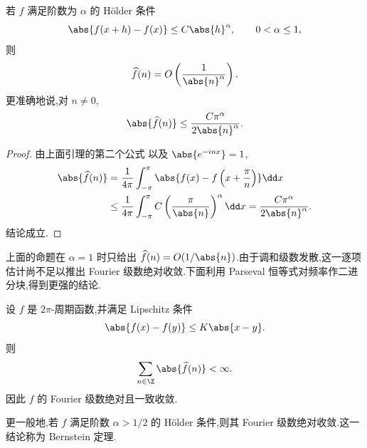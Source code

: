 \begin{proposition}
若 $f$ 满足阶数为 $\alpha$ 的 Hölder 条件
\[
\abs{f(x+h)-f(x)}\leq C\abs{h}^{\alpha},
\qquad 0<\alpha\leq1,
\]
则
\[
\widehat f(n)=O\left(\frac1{\abs{n}^{\alpha}}\right).
\]
更准确地说,对 $n\neq0$,
\[
\abs{\widehat f(n)}
\leq \frac{C\pi^{\alpha}}{2\abs{n}^{\alpha}}.
\]
\end{proposition}

\begin{proof}
由上面引理的第二个公式 以及 $\abs{e^{-inx}}=1$,
\[
\begin{aligned}
\abs{\widehat f(n)}
&=\frac1{4\pi}\int_{-\pi}^{\pi}
\abs{f(x)-f\left(x+\frac{\pi}{n}\right)}\dd x\\
&\leq\frac1{4\pi}\int_{-\pi}^{\pi}
C\left(\frac{\pi}{\abs{n}}\right)^{\alpha}\dd x
=\frac{C\pi^{\alpha}}{2\abs{n}^{\alpha}}.
\end{aligned}
\]
结论成立.
\end{proof}
上面的命题在 $\alpha=1$ 时只给出 $\widehat f(n)=O(1/\abs{n})$.由于调和级数发散,这一逐项估计尚不足以推出 Fourier 级数绝对收敛.下面利用 Parseval 恒等式对频率作二进分块,得到更强的结论.

\begin{proposition}
设 $f$ 是 $2\pi$-周期函数,并满足 Lipschitz 条件
\[
\abs{f(x)-f(y)}\leq K\abs{x-y}.
\]
则
\[
\sum_{n\in\Z}\abs{\widehat f(n)}<\infty.
\]
因此 $f$ 的 Fourier 级数绝对且一致收敛.

更一般地,若 $f$ 满足阶数 $\alpha>1/2$ 的 Hölder 条件,则其 Fourier 级数绝对收敛.这一结论称为 Bernstein 定理.
\end{proposition}

